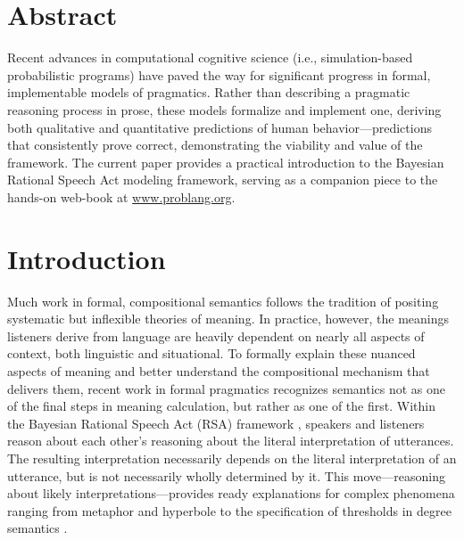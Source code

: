 \documentclass[10pt,letterpaper]{article}
\begin{document}
\section*{Abstract}
Recent advances in computational cognitive science (i.e., simulation-based probabilistic programs) have paved the way for significant progress in formal, implementable models of pragmatics. Rather than describing a pragmatic reasoning process in prose, these models formalize and implement one, deriving both qualitative and quantitative predictions of human behavior---predictions that consistently prove correct, demonstrating the viability and value of the framework. The current paper provides a practical introduction to the Bayesian Rational Speech Act modeling framework, serving as a companion piece to the hands-on web-book at \href{https://www.problang.org}{www.problang.org}. 


\linenumbers

\section*{Introduction}

Much work in formal, compositional semantics follows the tradition of positing systematic but inflexible theories of meaning. In practice, however, the meanings listeners derive from language are heavily dependent on nearly all aspects of context, both linguistic and situational. To formally explain these nuanced aspects of meaning and better understand the compositional mechanism that delivers them, recent work in formal pragmatics recognizes semantics not as one of the final steps in meaning calculation, but rather as one of the first. Within the Bayesian Rational Speech Act (RSA) framework \cite{goodmanfrank2016,frankejaeger2016}, speakers and listeners reason about each other's reasoning about the literal interpretation of utterances. The resulting interpretation necessarily depends on the literal interpretation of an utterance, but is not necessarily wholly determined by it. This move---reasoning about likely interpretations---provides ready explanations for complex phenomena ranging from metaphor \cite{kaoetal2014metaphor} and hyperbole \cite{kaoetal2014} to the specification of thresholds in degree semantics \cite{lassitergoodman2013}.
\end{document}
